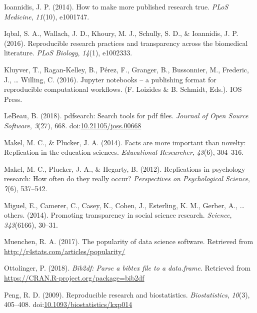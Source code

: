 \documentclass[
  english,
  ,man]{apa6}
\begin{document}
\leavevmode\hypertarget{ref-ioannidis2014}{}%
Ioannidis, J. P. (2014). How to make more published research true. \emph{PLoS Medicine}, \emph{11}(10), e1001747.

\leavevmode\hypertarget{ref-iqbal2016}{}%
Iqbal, S. A., Wallach, J. D., Khoury, M. J., Schully, S. D., \& Ioannidis, J. P. (2016). Reproducible research practices and transparency across the biomedical literature. \emph{PLoS Biology}, \emph{14}(1), e1002333.

\leavevmode\hypertarget{ref-kluyver2016}{}%
Kluyver, T., Ragan-Kelley, B., Pérez, F., Granger, B., Bussonnier, M., Frederic, J., \ldots{} Willing, C. (2016). Jupyter notebooks -- a publishing format for reproducible computational workflows. (F. Loizides \& B. Schmidt, Eds.). IOS Press.

\leavevmode\hypertarget{ref-pdfsearch}{}%
LeBeau, B. (2018). pdfsearch: Search tools for pdf files. \emph{Journal of Open Source Software}, \emph{3}(27), 668. doi:\href{https://doi.org/10.21105/joss.00668}{10.21105/joss.00668}

\leavevmode\hypertarget{ref-makel2014}{}%
Makel, M. C., \& Plucker, J. A. (2014). Facts are more important than novelty: Replication in the education sciences. \emph{Educational Researcher}, \emph{43}(6), 304--316.

\leavevmode\hypertarget{ref-makel2012}{}%
Makel, M. C., Plucker, J. A., \& Hegarty, B. (2012). Replications in psychology research: How often do they really occur? \emph{Perspectives on Psychological Science}, \emph{7}(6), 537--542.

\leavevmode\hypertarget{ref-miguel2014}{}%
Miguel, E., Camerer, C., Casey, K., Cohen, J., Esterling, K. M., Gerber, A., \ldots{} others. (2014). Promoting transparency in social science research. \emph{Science}, \emph{343}(6166), 30--31.

\leavevmode\hypertarget{ref-muenchen}{}%
Muenchen, R. A. (2017). The popularity of data science software. Retrieved from \url{http://r4stats.com/articles/popularity/}

\leavevmode\hypertarget{ref-bib2df}{}%
Ottolinger, P. (2018). \emph{Bib2df: Parse a bibtex file to a data.frame}. Retrieved from \url{https://CRAN.R-project.org/package=bib2df}

\leavevmode\hypertarget{ref-peng2009}{}%
Peng, R. D. (2009). Reproducible research and biostatistics. \emph{Biostatistics}, \emph{10}(3), 405--408. doi:\href{https://doi.org/10.1093/biostatistics/kxp014}{10.1093/biostatistics/kxp014}
\end{document}
